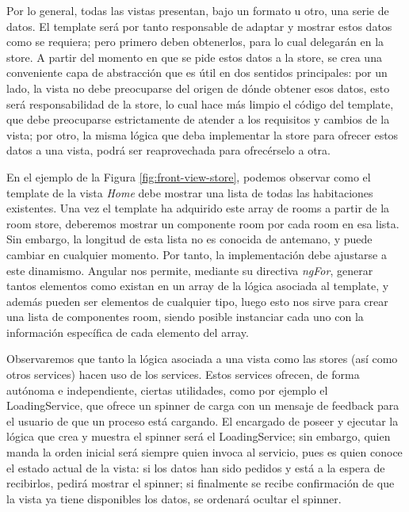 \vspace{0.5cm}

Por lo general, todas las vistas presentan, bajo un formato u otro, una serie de datos. El template será por tanto responsable de adaptar y mostrar estos datos como se requiera; pero primero deben obtenerlos, para lo cual delegarán en la store. A partir del momento en que se pide estos datos a la store, se crea una conveniente capa de abstracción que es útil en dos sentidos principales: por un lado, la vista no debe preocuparse del origen de dónde obtener esos datos, esto será responsabilidad de la store, lo cual hace más limpio el código del template, que debe preocuparse estrictamente de atender a los requisitos y cambios de la vista; por otro, la misma lógica que deba implementar la store para ofrecer estos datos a una vista, podrá ser reaprovechada para ofrecérselo a otra. 

\vspace{0.5cm}

En el ejemplo de la Figura \ref{fig:front-view-store}, podemos observar como el template de la vista \textit{Home} debe mostrar una lista de todas las habitaciones existentes. Una vez el template ha adquirido este array de rooms a partir de la room store, deberemos mostrar un componente room por cada room en esa lista. Sin embargo, la longitud de esta lista no es conocida de antemano, y puede cambiar en cualquier momento. Por tanto, la implementación debe ajustarse a este dinamismo. Angular nos permite, mediante su directiva \textit{ngFor}, generar tantos elementos como existan en un array de la lógica asociada al template, y además pueden ser elementos de cualquier tipo, luego esto nos sirve para crear una lista de componentes room, siendo posible instanciar cada uno con la información específica de cada elemento del array.

\vspace{0.5cm}

Observaremos que tanto la lógica asociada a una vista como las stores (así como otros services) hacen uso de los services. Estos services ofrecen, de forma autónoma e independiente, ciertas utilidades, como por ejemplo el LoadingService, que ofrece un spinner de carga con un mensaje de feedback para el usuario de que un proceso está cargando. El encargado de poseer y ejecutar la lógica que crea y muestra el spinner será el LoadingService; sin embargo, quien manda la orden inicial será siempre quien invoca al servicio, pues es quien conoce el estado actual de la vista: si los datos han sido pedidos y está a la espera de recibirlos, pedirá mostrar el spinner; si finalmente se recibe confirmación de que la vista ya tiene disponibles los datos, se ordenará ocultar el spinner. 

